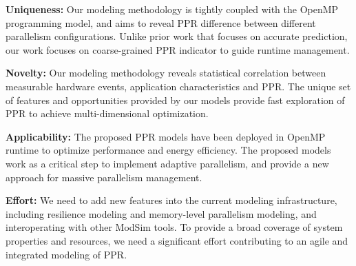 \documentclass{article}  %
\begin{document}
\textbf{Uniqueness:}
Our modeling methodology is tightly coupled with the OpenMP programming model,
and aims to reveal PPR difference between different parallelism configurations.
Unlike prior work that focuses on accurate prediction,
our work focuses on coarse-grained PPR indicator to guide runtime management.

\textbf{Novelty:} 
Our modeling methodology reveals statistical correlation
between measurable hardware events, application characteristics and 
PPR. The unique set of features and opportunities provided by our models
provide fast exploration of PPR to achieve multi-dimensional optimization.     

\textbf{Applicability:} 
The proposed PPR models have been deployed in OpenMP runtime to
optimize performance and energy efficiency.  
The proposed models work as a critical step to implement adaptive parallelism,
and provide a new approach for massive parallelism management.

\textbf{Effort:} We need to add new features into the current modeling infrastructure,
including resilience modeling and memory-level parallelism modeling,
and interoperating with other ModSim tools.
To provide a broad coverage of system properties and resources, we need
a significant effort contributing to an agile and integrated modeling
of PPR.



\end{document}

